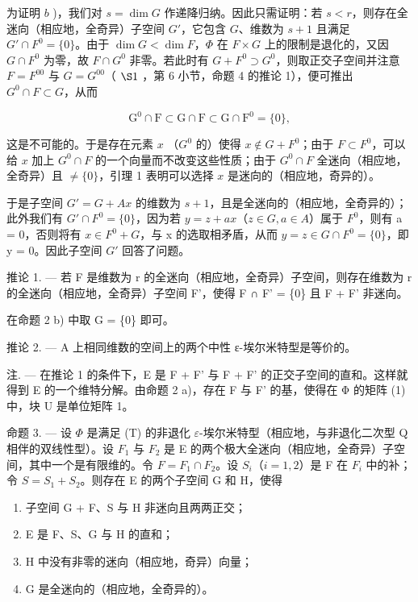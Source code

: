 为证明 \(b\) )，我们对 \(s = \dim G\) 作递降归纳。因此只需证明：若 \(s < r\)，则存在全迷向（相应地，全奇异）子空间 \(G'\)，它包含 \(G\)、维数为 \(s + 1\) 且满足 \(G' \cap F^0 = \{0\}\)。由于 \(\dim G < \dim F\)，\(\Phi\) 在 \(F \times G\) 上的限制是退化的，又因 \(G \cap F^0\) 为零，故 \(F \cap G^0\) 非零。若此时有 \(G + F^0 \supset G^0\)，则取正交子空间并注意 \(F = F^{00}\) 与 \(G = G^{00}\)（ \(\S 1\) ，第 6 小节，命题 4 的推论 1），便可推出 \(G^0 \cap F \subset G\)，从而

\[
\mathrm{G} ^ {0} \cap \mathrm{F} \subset \mathrm{G} \cap \mathrm{F} \subset \mathrm{G} \cap \mathrm{F} ^ {0} = \{0 \},
\]

这是不可能的。于是存在元素 \(x\) （\(G^0\) 的）使得 \(x \notin G + F^0\)；由于 \(F \subset F^0\)，可以给 \(x\) 加上 \(G^0 \cap F\) 的一个向量而不改变这些性质；由于 \(G^0 \cap F\) 全迷向（相应地，全奇异）且 \(\neq \{0\}\)，引理 1 表明可以选择 \(x\) 是迷向的（相应地，奇异的）。

于是子空间 \(G' = G + Ax\) 的维数为 \(s + 1\)，且是全迷向的（相应地，全奇异的）；此外我们有 \(G' \cap F^{0} = \{0\}\)，因为若 \(y = z + ax\)（\(z \in G, a \in A\)）属于 \(F^{0}\)，则有 a = 0，否则将有 \(x \in F^{0} + G\)，与 x 的选取相矛盾，从而 \(y = z \in G \cap F^{0} = \{0\}\)，即 y = 0。因此子空间 \(G'\) 回答了问题。

推论 1. --- 若 F 是维数为 r 的全迷向（相应地，全奇异）子空间，则存在维数为 r 的全迷向（相应地，全奇异）子空间 F'，使得 F ∩ F' = \{0\} 且 F + F' 非迷向。

在命题 2 b) 中取 G = \{0\} 即可。

推论 2. --- A 上相同维数的空间上的两个中性 ε-埃尔米特型是等价的。

注. --- 在推论 1 的条件下，E 是 F + F' 与 F + F' 的正交子空间的直和。这样就得到 E 的一个维特分解。由命题 2 a)，存在 F 与 F' 的基，使得在 Φ 的矩阵 (1) 中，块 U 是单位矩阵 1。

命题 3. --- 设 \(\Phi\) 是满足 (T) 的非退化 \(\varepsilon\)-埃尔米特型（相应地，与非退化二次型 Q 相伴的双线性型）。设 \(F_{1}\) 与 \(F_{2}\) 是 E 的两个极大全迷向（相应地，全奇异）子空间，其中一个是有限维的。令 \(F = F_{1} \cap F_{2}\)。设 \(S_{i}\)（\(i = 1, 2\)）是 F 在 \(F_{i}\) 中的补；令 \(S = S_{1} + S_{2}\)。则存在 E 的两个子空间 G 和 H，使得

\begin{enumerate}
\def\labelenumi{\alph{enumi})}
\item
  子空间 G + F、S 与 H 非迷向且两两正交；
\item
  E 是 F、S、G 与 H 的直和；
\item
  H 中没有非零的迷向（相应地，奇异）向量；
\item
  G 是全迷向的（相应地，全奇异的）。
\end{enumerate}

